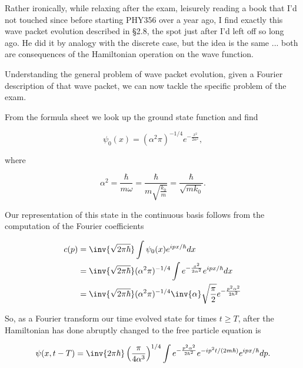 Rather ironically, while relaxing after the exam, leisurely reading a book \cite{pauli2000wm} that I'd not touched since before starting PHY356 over a year ago, I find exactly this wave packet evolution described in \S 2.8, the spot just after I'd left off so long ago.  He did it by analogy with the discrete case, but the idea is the same ... both are consequences of the Hamiltonian operation on the wave function.

Understanding the general problem of wave packet evolution, given a Fourier description of that wave packet, we can now tackle the specific problem of the exam.

From the formula sheet we look up the ground state function and find

\begin{equation}\label{eqn:qmTwoExamReflection:250}
\psi_0(x) = (\alpha^2 \pi)^{-1/4} e^{-\frac{x^2}{2\alpha^2}},
\end{equation}

where

\begin{equation}\label{eqn:qmTwoExamReflection:270}
\alpha^2 
= \frac{\hbar}{m \omega}  
= \frac{\hbar}{m \sqrt{\frac{k_0}{m}}}  
= \frac{\hbar}{\sqrt{m k_0}}.
\end{equation}

Our representation of this state in the continuous basis follows from the computation of the Fourier coefficients

\begin{align*}
c(p) 
&= 
\inv{\sqrt{2 \pi \hbar}} \int \psi_0(x) e^{i p x/\hbar} dx \\
&= 
\inv{\sqrt{2 \pi \hbar}} 
(\alpha^2 \pi)^{-1/4} 
\int 
e^{-\frac{x^2}{2\alpha^2}}
e^{i p x/\hbar} dx \\
&=
\inv{\sqrt{2 \pi \hbar}} 
(\alpha^2 \pi)^{-1/4} 
\inv{\alpha} \sqrt{\frac{\pi}{2}}
e^{-\frac{p^2 \alpha^2}{2 \hbar^2}} \\
\end{align*}

So, as a Fourier transform our time evolved state for times $t \ge T$, after the Hamiltonian has done abruptly changed to the free particle equation is

\begin{equation}\label{eqn:qmTwoExamReflection:290}
\psi(x, t - T) = 
\inv{2 \pi \hbar} \left( \frac{\pi}{4 \alpha^3} \right)^{1/4}
\int
e^{-\frac{p^2 \alpha^2}{2 \hbar^2}} 
e^{-i p^2 t/(2m \hbar)} e^{i p x/\hbar} dp.
\end{equation}

